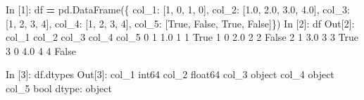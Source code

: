 \documentclass[
]{book}
\newenvironment{Shaded}{\begin{snugshade}}{\end{snugshade}}
\newcommand{\BuiltInTok}[1]{#1}
\newcommand{\DecValTok}[1]{\textcolor[rgb]{0.00,0.00,0.81}{#1}}
\newcommand{\FloatTok}[1]{\textcolor[rgb]{0.00,0.00,0.81}{#1}}
\newcommand{\NormalTok}[1]{#1}
\newcommand{\OperatorTok}[1]{\textcolor[rgb]{0.81,0.36,0.00}{\textbf{#1}}}
\newcommand{\StringTok}[1]{\textcolor[rgb]{0.31,0.60,0.02}{#1}}
\newcommand{\VariableTok}[1]{\textcolor[rgb]{0.00,0.00,0.00}{#1}}
\begin{document}
\begin{Shaded}
\begin{Highlighting}[]
\NormalTok{In [}\DecValTok{1}\NormalTok{]: df }\OperatorTok{=}\NormalTok{ pd.DataFrame(\{}
                           \StringTok{\textquotesingle{}col\_1\textquotesingle{}}\NormalTok{: [}\DecValTok{1}\NormalTok{, }\DecValTok{0}\NormalTok{, }\DecValTok{1}\NormalTok{, }\DecValTok{0}\NormalTok{], }
                           \StringTok{\textquotesingle{}col\_2\textquotesingle{}}\NormalTok{: [}\FloatTok{1.0}\NormalTok{, }\FloatTok{2.0}\NormalTok{, }\FloatTok{3.0}\NormalTok{, }\FloatTok{4.0}\NormalTok{], }
                           \StringTok{\textquotesingle{}col\_3\textquotesingle{}}\NormalTok{: [}\StringTok{\textquotesingle{}1\textquotesingle{}}\NormalTok{, }\StringTok{\textquotesingle{}2\textquotesingle{}}\NormalTok{, }\StringTok{\textquotesingle{}3\textquotesingle{}}\NormalTok{, }\StringTok{\textquotesingle{}4\textquotesingle{}}\NormalTok{],}
                           \StringTok{\textquotesingle{}col\_4\textquotesingle{}}\NormalTok{: [}\StringTok{\textquotesingle{}1\textquotesingle{}}\NormalTok{, }\DecValTok{2}\NormalTok{, }\StringTok{\textquotesingle{}3\textquotesingle{}}\NormalTok{, }\DecValTok{4}\NormalTok{],}
                           \StringTok{\textquotesingle{}col\_5\textquotesingle{}}\NormalTok{: [}\VariableTok{True}\NormalTok{, }\VariableTok{False}\NormalTok{, }\VariableTok{True}\NormalTok{, }\VariableTok{False}\NormalTok{]\})}
\NormalTok{In [}\DecValTok{2}\NormalTok{]: df}
\NormalTok{Out[}\DecValTok{2}\NormalTok{]:}
\NormalTok{   col\_1  col\_2 col\_3 col\_4  col\_5}
\DecValTok{0}      \DecValTok{1}    \FloatTok{1.0}     \DecValTok{1}     \DecValTok{1}   \VariableTok{True}
\DecValTok{1}      \DecValTok{0}    \FloatTok{2.0}     \DecValTok{2}     \DecValTok{2}  \VariableTok{False}
\DecValTok{2}      \DecValTok{1}    \FloatTok{3.0}     \DecValTok{3}     \DecValTok{3}   \VariableTok{True}
\DecValTok{3}      \DecValTok{0}    \FloatTok{4.0}     \DecValTok{4}     \DecValTok{4}  \VariableTok{False}
\end{Highlighting}
\end{Shaded}

\begin{Shaded}
\begin{Highlighting}[]
\NormalTok{In [}\DecValTok{3}\NormalTok{]: df.dtypes}
\NormalTok{Out[}\DecValTok{3}\NormalTok{]:}
\NormalTok{col\_1      int64}
\NormalTok{col\_2    float64}
\NormalTok{col\_3     }\BuiltInTok{object}
\NormalTok{col\_4     }\BuiltInTok{object}
\NormalTok{col\_5       }\BuiltInTok{bool}
\NormalTok{dtype: }\BuiltInTok{object}
\end{Highlighting}
\end{Shaded}
\end{document}
